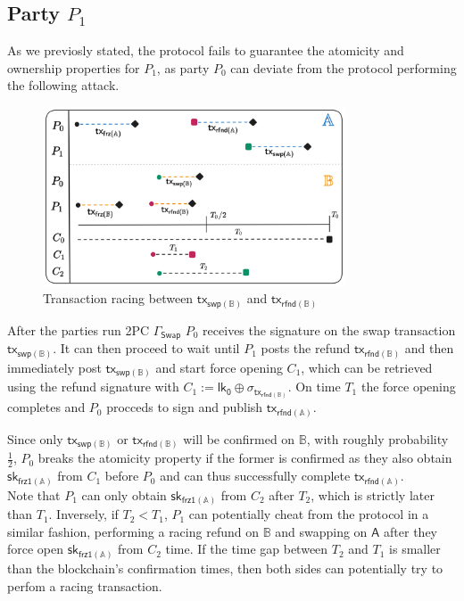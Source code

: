 \documentclass{article}      	%
\begin{document}
\subsection{Party $P_1$}
As we previosly stated, the protocol fails to guarantee the atomicity and ownership properties for $P_1$, as party $P_0$ can deviate from the protocol performing the following attack. \\
\begin{figure}[H]
    \centering
    \includegraphics[width=0.8\textwidth]{timeouts.png}
    \caption{Transaction racing between  $\mathsf{tx_{swp(\mathbb{B})}}$ and $\mathsf{tx_{rfnd(\mathbb{B})}}$}
\end{figure}
After the parties run 2PC $\Gamma_{\mathsf{Swap}}$ $P_0$ receives the signature on the swap transaction $\mathsf{tx_{swp(\mathbb{B})}}$. It can then proceed to wait until $P_1$ posts the refund $\mathsf{tx_{rfnd(\mathbb{B})}}$ and then immediately post $\mathsf{tx_{swp(\mathbb{B})}}$ and start force opening $C_1$, which can be retrieved using the refund signature with $C_1 := \mathsf{lk_0} \oplus \sigma_{\mathsf{tx_{rfnd(\mathbb{B})}}}$. On time $T_1$ the force opening completes and $P_0$ procceds to sign and publish $\mathsf{tx_{rfnd(\mathbb{A})}}$.

Since only $\mathsf{tx_{swp(\mathbb{B})}}$ or $\mathsf{tx_{rfnd(\mathbb{B})}}$ will be confirmed on $\mathbb{B}$, with roughly probability $\frac{1}{2}$, $P_0$ breaks the atomicity property if the former is confirmed as they also obtain $\mathsf{sk_{frz1(\mathbb{A})}}$ from $C_1$ before $P_0$ and can thus successfully complete $\mathsf{tx_{rfnd(\mathbb{A})}}$. \\
Note that $P_1$ can only obtain $\mathsf{sk_{frz1(\mathbb{A})}}$ from $C_2$ after $T_2$, which is strictly later than $T_1$. Inversely, if $T_2 < T_1$, $P_1$ can potentially cheat from the protocol in a similar fashion, performing a racing refund on $\mathbb{B}$ and swapping on $\mathsf{A}$ after they force open $\mathsf{sk_{frz1(\mathbb{A})}}$ from $C_2$ time. If the time gap between $T_2$ and $T_1$ is smaller than the blockchain's confirmation times, then both sides can potentially try to perfom a racing transaction.
\end{document}
